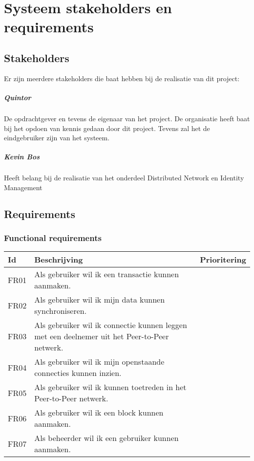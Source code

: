 \chapter{Systeem stakeholders en requirements}

\section{Stakeholders}

Er zijn meerdere stakeholders die baat hebben bij de realisatie van dit project:

\paragraph{Quintor} De opdrachtgever en tevens de eigenaar van het project. De organisatie heeft baat bij het opdoen van kennis gedaan door dit project. Tevens zal het de eindgebruiker zijn van het systeem.

\paragraph{Kevin Bos} Heeft belang bij de realisatie van het onderdeel Distributed Network en Identity Management

\newpage
\section{Requirements}

\subsection{Functional requirements}

\begin{tabular}{|p{1.1cm}|p{8cm}|p{3cm}|}
  \hline
  \textbf{Id} & \textbf{Beschrijving} & \textbf{Prioritering} \\
  \hline
  FR01 & Als gebruiker wil ik een transactie kunnen aanmaken. & \\
  \hline
  FR02 & Als gebruiker wil ik mijn data kunnen synchroniseren. & \\
  \hline
  FR03 & Als gebruiker wil ik connectie kunnen leggen met een deelnemer uit het Peer-to-Peer netwerk. & \\
  \hline
  FR04 & Als gebruiker wil ik mijn openstaande connecties kunnen inzien. & \\
  \hline
  FR05 & Als gebruiker wil ik kunnen toetreden in het Peer-to-Peer netwerk. & \\
  \hline
  FR06 & Als gebruiker wil ik een block kunnen aanmaken. & \\
  \hline
  FR07 & Als beheerder wil ik een gebruiker kunnen aanmaken. & \\
  \hline
\end{tabular}

